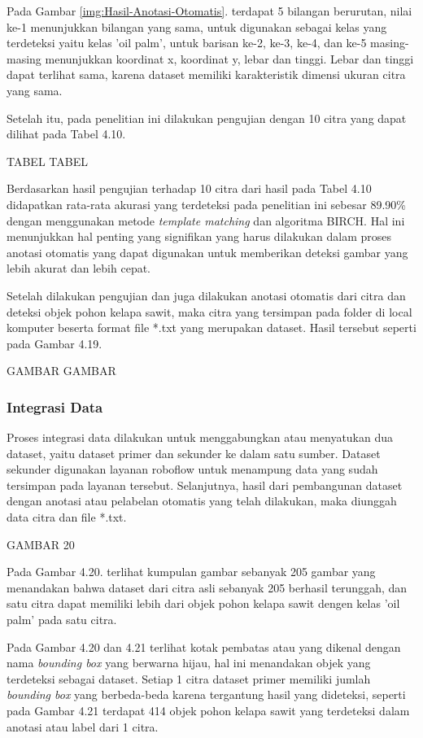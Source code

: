 Pada Gambar \ref{img:Hasil-Anotasi-Otomatis}. terdapat 5 bilangan berurutan, nilai ke-1 menunjukkan bilangan yang sama, untuk digunakan sebagai kelas yang terdeteksi yaitu kelas 'oil palm', untuk barisan ke-2, ke-3, ke-4, dan ke-5 masing-masing menunjukkan koordinat x, koordinat y, lebar dan tinggi. Lebar dan tinggi dapat terlihat sama, karena dataset memiliki karakteristik dimensi ukuran citra yang sama.

Setelah itu, pada penelitian ini dilakukan pengujian dengan 10 citra yang dapat dilihat pada Tabel 4.10.

TABEL TABEL

Berdasarkan hasil pengujian terhadap 10 citra dari hasil pada Tabel 4.10 didapatkan rata-rata akurasi yang terdeteksi pada penelitian ini sebesar 89.90\% dengan menggunakan metode \textit{template matching} dan algoritma BIRCH. Hal ini menunjukkan hal penting yang signifikan yang harus dilakukan dalam proses anotasi otomatis yang dapat digunakan untuk memberikan deteksi gambar yang lebih akurat dan lebih cepat.

Setelah dilakukan pengujian dan juga dilakukan anotasi otomatis dari citra dan deteksi objek pohon kelapa sawit, maka citra yang tersimpan pada folder di local komputer beserta format file *.txt yang merupakan dataset. Hasil tersebut seperti pada Gambar 4.19.

GAMBAR GAMBAR

\subsubsection{Integrasi Data}
\hspace{1,2cm}
Proses integrasi data dilakukan untuk menggabungkan atau menyatukan dua dataset, yaitu dataset primer dan sekunder ke dalam satu sumber. Dataset sekunder digunakan layanan roboflow untuk menampung data yang sudah tersimpan pada layanan tersebut. Selanjutnya, hasil dari pembangunan dataset dengan anotasi atau pelabelan otomatis yang telah dilakukan, maka diunggah data citra dan file *.txt. 


GAMBAR 20


Pada Gambar 4.20. terlihat kumpulan gambar sebanyak 205 gambar yang menandakan bahwa dataset dari citra asli sebanyak 205 berhasil terunggah, dan satu citra dapat memiliki lebih dari objek pohon kelapa sawit dengen kelas 'oil palm' pada satu citra. 

Pada Gambar 4.20 dan 4.21 terlihat kotak pembatas atau yang dikenal dengan nama \textit{bounding box} yang berwarna hijau, hal ini menandakan objek yang terdeteksi sebagai dataset. Setiap 1 citra dataset primer memiliki jumlah \textit{bounding box} yang berbeda-beda karena tergantung hasil yang dideteksi, seperti pada Gambar 4.21 terdapat 414 objek pohon kelapa sawit yang terdeteksi dalam anotasi atau label dari 1 citra. 

